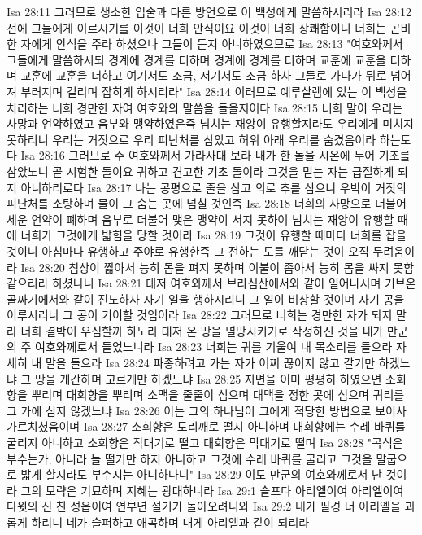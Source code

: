 Isa 28:11  그러므로 생소한 입술과 다른 방언으로 이 백성에게 말씀하시리라
Isa 28:12  전에 그들에게 이르시기를 이것이 너희 안식이요 이것이 너희 상쾌함이니 너희는 곤비한 자에게 안식을 주라 하셨으나 그들이 듣지 아니하였으므로
Isa 28:13  "여호와께서 그들에게 말씀하시되 경계에 경계를 더하며 경계에 경계를 더하며 교훈에 교훈을 더하며 교훈에 교훈을 더하고 여기서도 조금, 저기서도 조금 하사 그들로 가다가 뒤로 넘어져 부러지며 걸리며 잡히게 하시리라"
Isa 28:14  이러므로 예루살렘에 있는 이 백성을 치리하는 너희 경만한 자여 여호와의 말씀을 들을지어다
Isa 28:15  너희 말이 우리는 사망과 언약하였고 음부와 맹약하였은즉 넘치는 재앙이 유행할지라도 우리에게 미치지 못하리니 우리는 거짓으로 우리 피난처를 삼았고 허위 아래 우리를 숨겼음이라 하는도다
Isa 28:16  그러므로 주 여호와께서 가라사대 보라 내가 한 돌을 시온에 두어 기초를 삼았노니 곧 시험한 돌이요 귀하고 견고한 기초 돌이라 그것을 믿는 자는 급절하게 되지 아니하리로다
Isa 28:17  나는 공평으로 줄을 삼고 의로 추를 삼으니 우박이 거짓의 피난처를 소탕하며 물이 그 숨는 곳에 넘칠 것인즉
Isa 28:18  너희의 사망으로 더불어 세운 언약이 폐하며 음부로 더불어 맺은 맹약이 서지 못하여 넘치는 재앙이 유행할 때에 너희가 그것에게 밟힘을 당할 것이라
Isa 28:19  그것이 유행할 때마다 너희를 잡을 것이니 아침마다 유행하고 주야로 유행한즉 그 전하는 도를 깨닫는 것이 오직 두려움이라
Isa 28:20  침상이 짧아서 능히 몸을 펴지 못하며 이불이 좁아서 능히 몸을 싸지 못함 같으리라 하셨나니
Isa 28:21  대저 여호와께서 브라심산에서와 같이 일어나시며 기브온 골짜기에서와 같이 진노하사 자기 일을 행하시리니 그 일이 비상할 것이며 자기 공을 이루시리니 그 공이 기이할 것임이라
Isa 28:22  그러므로 너희는 경만한 자가 되지 말라 너희 결박이 우심할까 하노라 대저 온 땅을 멸망시키기로 작정하신 것을 내가 만군의 주 여호와께로서 들었느니라
Isa 28:23  너희는 귀를 기울여 내 목소리를 들으라 자세히 내 말을 들으라
Isa 28:24  파종하려고 가는 자가 어찌 끊이지 않고 갈기만 하겠느냐 그 땅을 개간하며 고르게만 하겠느냐
Isa 28:25  지면을 이미 평평히 하였으면 소회향을 뿌리며 대회향을 뿌리며 소맥을 줄줄이 심으며 대맥을 정한 곳에 심으며 귀리를 그 가에 심지 않겠느냐
Isa 28:26  이는 그의 하나님이 그에게 적당한 방법으로 보이사 가르치셨음이며
Isa 28:27  소회향은 도리깨로 떨지 아니하며 대회향에는 수레 바퀴를 굴리지 아니하고 소회향은 작대기로 떨고 대회향은 막대기로 떨며
Isa 28:28  "곡식은 부수는가, 아니라 늘 떨기만 하지 아니하고 그것에 수레 바퀴를 굴리고 그것을 말굽으로 밟게 할지라도 부수지는 아니하나니"
Isa 28:29  이도 만군의 여호와께로서 난 것이라 그의 모략은 기묘하며 지혜는 광대하니라
Isa 29:1  슬프다 아리엘이여 아리엘이여 다윗의 진 친 성읍이여 연부년 절기가 돌아오려니와
Isa 29:2  내가 필경 너 아리엘을 괴롭게 하리니 네가 슬퍼하고 애곡하며 내게 아리엘과 같이 되리라
